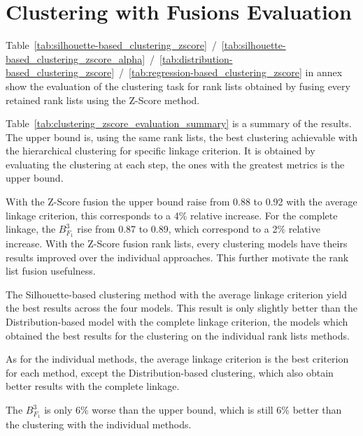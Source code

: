 \section{Clustering with Fusions Evaluation}

Table~\ref{tab:silhouette-based_clustering_zscore}~/~\ref{tab:silhouette-based_clustering_zscore_alpha}~/~\ref{tab:distribution-based_clustering_zscore}~/~\ref{tab:regression-based_clustering_zscore} in annex show the evaluation of the clustering task for rank lists obtained by fusing every retained rank lists using the Z-Score method.

Table~\ref{tab:clustering_zscore_evaluation_summary} is a summary of the results.
The upper bound is, using the same rank lists, the best clustering achievable with the hierarchical clustering for specific linkage criterion.
It is obtained by evaluating the clustering at each step, the ones with the greatest metrics is the upper bound.

With the Z-Score fusion the upper bound raise from 0.88 to 0.92 with the average linkage criterion, this corresponds to a 4\% relative increase.
For the complete linkage, the $B^{3}_{F_1}$ rise from 0.87 to 0.89, which correspond to a 2\% relative increase.
With the Z-Score fusion rank lists, every clustering models have theirs results improved over the individual approaches.
This further motivate the rank list fusion usefulness.

The Silhouette-based clustering method with the average linkage criterion yield the best results across the four models.
This result is only slightly better than the Distribution-based model with the complete linkage criterion, the models which obtained the best results for the clustering on the individual rank lists methods.

As for the individual methods, the average linkage criterion is the best criterion for each method, except the Distribution-based clustering, which also obtain better results with the complete linkage.

The $B^{3}_{F_1}$ is only 6\% worse than the upper bound, which is still 6\% better than the clustering with the individual methods.

